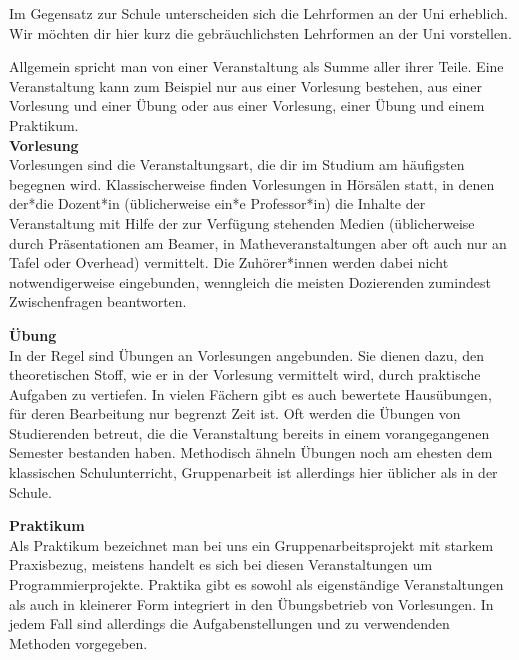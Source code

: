 {Im Gegensatz zur Schule unterscheiden sich die Lehrformen an der Uni erheblich. Wir möchten dir hier kurz die gebräuchlichsten Lehrformen an der Uni vorstellen.}
{Allgemein spricht man von einer Veranstaltung als Summe aller ihrer Teile. Eine Veranstaltung kann zum Beispiel nur aus einer Vorlesung bestehen, aus einer Vorlesung und einer Übung oder aus einer Vorlesung, einer Übung und einem Praktikum.\\

\textbf{Vorlesung}\\

Vorlesungen sind die Veranstaltungsart, die dir im Studium am häufigsten begegnen wird. Klassischerweise finden Vorlesungen in Hörsälen statt, in denen der*die Dozent*in (üblicherweise ein*e Professor*in) die Inhalte der Veranstaltung mit Hilfe der zur Verfügung stehenden Medien (üblicherweise durch Präsentationen am Beamer, in Matheveranstaltungen aber oft auch nur an Tafel oder Overhead) vermittelt. Die Zuhörer*innen werden dabei nicht notwendigerweise eingebunden, wenngleich die meisten Dozierenden zumindest Zwischenfragen beantworten.

\textbf{Übung}\\

In der Regel sind Übungen an Vorlesungen angebunden. Sie dienen dazu, den theoretischen Stoff, wie er in der Vorlesung vermittelt wird, durch praktische Aufgaben zu vertiefen. In vielen Fächern gibt es auch bewertete Hausübungen, für deren Bearbeitung nur begrenzt Zeit ist. Oft werden die Übungen von Studierenden betreut, die die Veranstaltung bereits in einem vorangegangenen Semester bestanden haben. Methodisch ähneln Übungen noch am ehesten dem klassischen Schulunterricht, Gruppenarbeit ist allerdings hier üblicher als in der Schule.

\newpage

\textbf{Praktikum}\\

Als Praktikum bezeichnet man bei uns ein Gruppenarbeitsprojekt mit starkem Praxisbezug, meistens handelt es sich bei diesen Veranstaltungen um Programmierprojekte. Praktika gibt es sowohl als eigenständige Veranstaltungen als auch in kleinerer Form integriert in den Übungsbetrieb von Vorlesungen. In jedem Fall sind allerdings die Aufgabenstellungen und zu verwendenden Methoden vorgegeben.

}

